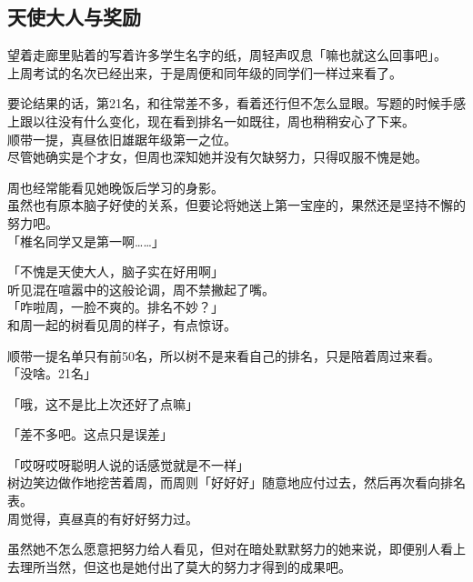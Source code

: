 \subsection{天使大人与奖励}

望着走廊里贴着的写着许多学生名字的纸，周轻声叹息「嘛也就这么回事吧」。\\

上周考试的名次已经出来，于是周便和同年级的同学们一样过来看了。

要论结果的话，第21名，和往常差不多，看着还行但不怎么显眼。写题的时候手感上跟以往没有什么变化，现在看到排名一如既往，周也稍稍安心了下来。\\

顺带一提，真昼依旧雄踞年级第一之位。\\

尽管她确实是个才女，但周也深知她并没有欠缺努力，只得叹服不愧是她。

周也经常能看见她晚饭后学习的身影。\\

虽然也有原本脑子好使的关系，但要论将她送上第一宝座的，果然还是坚持不懈的努力吧。\\

「椎名同学又是第一啊……」

「不愧是天使大人，脑子实在好用啊」\\

听见混在喧嚣中的这般论调，周不禁撇起了嘴。\\

「咋啦周，一脸不爽的。排名不妙？」\\

和周一起的树看见周的样子，有点惊讶。

顺带一提名单只有前50名，所以树不是来看自己的排名，只是陪着周过来看。\\

「没啥。21名」

「哦，这不是比上次还好了点嘛」

「差不多吧。这点只是误差」

「哎呀哎呀聪明人说的话感觉就是不一样」\\

树边笑边做作地挖苦着周，而周则「好好好」随意地应付过去，然后再次看向排名表。\\

周觉得，真昼真的有好好努力过。

虽然她不怎么愿意把努力给人看见，但对在暗处默默努力的她来说，即便别人看上去理所当然，但这也是她付出了莫大的努力才得到的成果吧。\\

